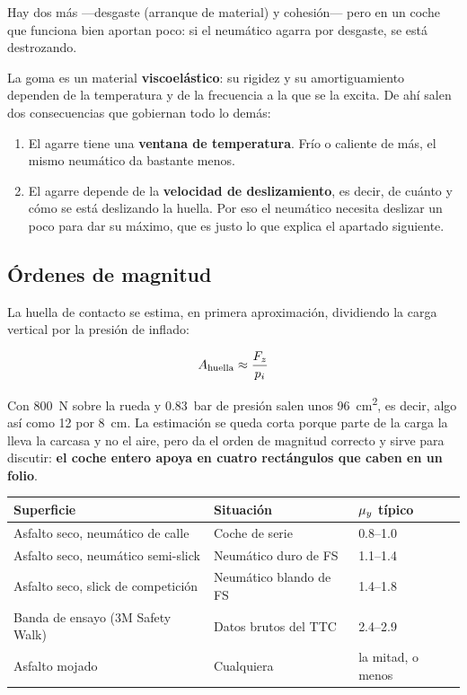 Hay dos más ---desgaste (arranque de material) y cohesión--- pero en un coche
que funciona bien aportan poco: si el neumático agarra por desgaste, se está
destrozando.

\begin{clave}
La goma es un material \textbf{viscoelástico}: su rigidez y su amortiguamiento
dependen de la temperatura y de la frecuencia a la que se la excita. De ahí salen
dos consecuencias que gobiernan todo lo demás:

\begin{enumerate}
  \item El agarre tiene una \textbf{ventana de temperatura}. Frío o caliente de
        más, el mismo neumático da bastante menos.
  \item El agarre depende de la \textbf{velocidad de deslizamiento}, es decir, de
        cuánto y cómo se está deslizando la huella. Por eso el neumático necesita
        deslizar un poco para dar su máximo, que es justo lo que explica el
        apartado siguiente.
\end{enumerate}
\end{clave}

\subsection{Órdenes de magnitud}

La huella de contacto se estima, en primera aproximación, dividiendo la carga
vertical por la presión de inflado:

\begin{equation}
  A_{\text{huella}} \approx \frac{F_z}{p_i}
  \label{eq:area_huella}
\end{equation}

Con \SI{800}{\newton} sobre la rueda y \SI{0.83}{\bar} de presión salen unos
\SI{96}{\centi\meter\squared}, es decir, algo así como \num{12} por
\SI{8}{\centi\meter}. La estimación se queda corta porque parte de la carga la
lleva la carcasa y no el aire, pero da el orden de magnitud correcto y sirve para
discutir: \textbf{el coche entero apoya en cuatro rectángulos que caben en un
folio}.

\begin{center}
\begin{tabularx}{\textwidth}{@{}lXl@{}}
\toprule
\textbf{Superficie} & \textbf{Situación} & \textbf{$\mu_y$ típico} \\
\midrule
Asfalto seco, neumático de calle & Coche de serie & \numrange{0.8}{1.0} \\
Asfalto seco, neumático semi-slick & Neumático duro de FS & \numrange{1.1}{1.4} \\
Asfalto seco, slick de competición & Neumático blando de FS & \numrange{1.4}{1.8} \\
Banda de ensayo (3M Safety Walk) & Datos brutos del TTC & \numrange{2.4}{2.9} \\
Asfalto mojado & Cualquiera & la mitad, o menos \\
\bottomrule
\end{tabularx}
\end{center}

